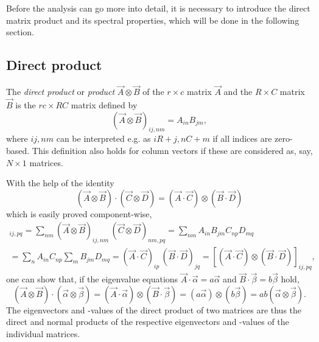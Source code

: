 Before the analysis can go more into detail, it is necessary to introduce the
direct matrix product and its spectral properties, which will be done in the
following section.

\subsection{Direct product}

The \emph{direct product} or \emph{ product} $\vec A \otimes
\vec B$ of the $r \times c$ matrix $\vec A$ and the $R \times C$ matrix $\vec B$
is the $r c \times R C$ matrix defined by
%
\begin{equation*}
    (\vec A \otimes \vec B)_{i j, n m} = A_{i n} B_{j m},
\end{equation*}
%
where $i j, n m$ can be interpreted e.g. as $i R + j, n C + m$ if all indices
are zero-based. This definition also holds for column vectors if these are
considered as, say, $N \times 1$ matrices.

With the help of the identity
%
\begin{equation*}
    (\vec A \otimes \vec B) \cdot (\vec C \otimes \vec D)
    = (\vec A \cdot \vec C) \otimes (\vec B \cdot \vec D)
\end{equation*}
%
which is easily proved component-wise,
%
\begin{multline*}
    [(\vec A \otimes \vec B) \cdot (\vec C \otimes \vec D)]_{i j, p q}
    = \sum_{n m}
        (\vec A \otimes \vec B)_{i j, n m} \,
        (\vec C \otimes \vec D)_{n m, p q}
    = \sum_{n m} A_{i n} B_{j m} C_{n p} D_{m q}
    \\
    = \sum_n A_{i n} C_{n p} \sum_m B_{j m} D_{m q}
    = (\vec A \cdot \vec C)_{i p} \, (\vec B \cdot \vec D)_{j q}
    = [(\vec A \cdot \vec C) \otimes (\vec B \cdot \vec D)]_{i j, p q},
\end{multline*}
%
one can show that, if the eigenvalue equations $\vec A \cdot \vec \alpha = a
\vec \alpha$ and $\vec B \cdot \vec \beta = b \vec \beta$ hold,
%
\begin{equation} \label{eigenvalues direct product}
    (\vec A \otimes \vec B) \cdot (\vec \alpha \otimes \vec \beta)
    = (\vec A \cdot \vec \alpha) \otimes (\vec B \cdot \vec \beta)
    = (a \vec \alpha) \otimes (b \vec \beta)
    = a b (\vec \alpha \otimes \vec \beta).
\end{equation}
%
The eigenvectors and -values of the direct product of two matrices are thus the
direct and normal products of the respective eigenvectors and -values of the
individual matrices.

